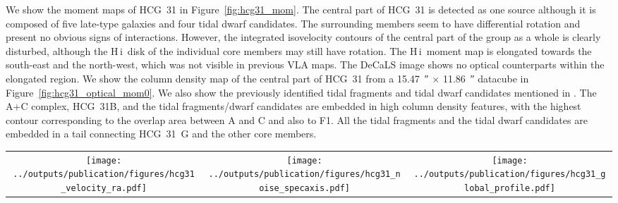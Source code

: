 \documentclass{aa}
\newcommand{\HI}{H\,{\sc i}}
\begin{document}
We show the moment maps of HCG~31 in Figure~\ref{fig:hcg31_mom}. The central part of HCG~31 is detected as one source although 
it is composed of five late-type galaxies and four tidal dwarf candidates. The surrounding members seem to have differential rotation and present no obvious signs of interactions. 
However, the integrated isovelocity contours of the central part of the group as a whole is clearly disturbed, although the \HI\ disk of the individual 
core members may still have rotation. The \HI\ moment map is elongated towards the south-east and the north-west, which was not visible in previous VLA maps. The DeCaLS image shows no optical counterparts within the elongated region.
We show the column density map of the central part of HCG~31 from a \SI{15.47}{\arcsecond} $\times$ \SI{11.86}{\arcsecond} datacube in 
Figure~\ref{fig:hcg31_optical_mom0}. We also show the previously 
identified tidal fragments and tidal dwarf candidates mentioned in \citet{2006AJ....132..570M}. 
The A+C complex, HCG~31B, and the tidal fragments/dwarf candidates are embedded in high column density features, with the highest contour corresponding to the overlap area between A and C and also to F1. All the tidal 
fragments and the tidal dwarf candidates are embedded in a tail connecting HCG~31~G and the other core members. 

\begin{figure*}
\setlength{\tabcolsep}{0pt}
\begin{tabular}{c c c}
    \texttt{[image: ../outputs/publication/figures/hcg31\_velocity\_ra.pdf]} &
    \texttt{[image: ../outputs/publication/figures/hcg31\_noise\_specaxis.pdf]} & 
    \texttt{[image: ../outputs/publication/figures/hcg31\_global\_profile.pdf]}
  \end{tabular}
  \caption{Left panel: velocity vs right ascension of HCG~31. Middle panel: median noise values of each RA-DEC slice of the non-primary beam corrected \SI{60}{\arcsecond} data cube of 
  HCG~31 as a function of velocity. The horizontal dashed line indicates the median of all the noise values from each slice. Right panel: the blue solid lines indicates the 
  MeerKAT integrated spectrum of HCG~31; the red solid line indicates VLA integrated spectrum of the group derived by \citep{2023A&A...670A..21J}. 
  The vertical dotted lines indicate the velocities of the galaxies in the core of the group. The spectra have been extracted from area containing only genuine \HI\ emission.}
  \label{fig:hcg31_noise}
 \end{figure*}
%
\end{document}
